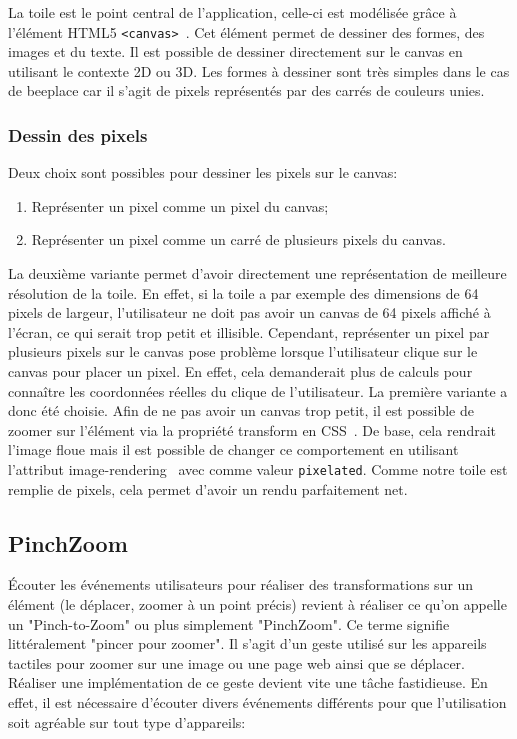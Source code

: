La toile est le point central de l'application, celle-ci est modélisée grâce à l'élément HTML5 \texttt{<canvas>}~\cite{canvas}. Cet élément permet de dessiner des formes, des images et du texte. Il est possible de dessiner directement sur le canvas en utilisant le contexte 2D ou 3D. Les formes à dessiner sont très simples dans le cas de \gls{beeplace} car il s'agit de pixels représentés par des carrés de couleurs unies.

\subsubsection{Dessin des pixels}

Deux choix sont possibles pour dessiner les pixels sur le canvas:

\begin{enumerate}
  \item Représenter un pixel comme un pixel du canvas;
  \item Représenter un pixel comme un carré de plusieurs pixels du canvas.
\end{enumerate}

La deuxième variante permet d'avoir directement une représentation de meilleure résolution de la toile. En effet, si la toile a par exemple des dimensions de 64 pixels de largeur, l'utilisateur ne doit pas avoir un canvas de 64 pixels affiché à l'écran, ce qui serait trop petit et illisible. Cependant, représenter un pixel par plusieurs pixels sur le canvas pose problème lorsque l'utilisateur clique sur le canvas pour placer un pixel. En effet, cela demanderait plus de calculs pour connaître les coordonnées réelles du clique de l'utilisateur. La première variante a donc été choisie. Afin de ne pas avoir un canvas trop petit, il est possible de zoomer sur l'élément via la propriété transform en CSS~\cite{transformcss}. De base, cela rendrait l'image floue mais il est possible de changer ce comportement en utilisant l'attribut image-rendering~\cite{image-renderingcss} avec comme valeur \texttt{pixelated}. Comme notre toile est remplie de pixels, cela permet d'avoir un rendu parfaitement net.

\subsection{PinchZoom}

Écouter les événements utilisateurs pour réaliser des transformations sur un élément (le déplacer, zoomer à un point précis) revient à réaliser ce qu'on appelle un "Pinch-to-Zoom" ou plus simplement "PinchZoom". Ce terme signifie littéralement "pincer pour zoomer". Il s'agit d'un geste utilisé sur les appareils tactiles pour zoomer sur une image ou une page web ainsi que se déplacer. Réaliser une implémentation de ce geste devient vite une tâche fastidieuse. En effet, il est nécessaire d'écouter divers événements différents pour que l'utilisation soit agréable sur tout type d'appareils:

